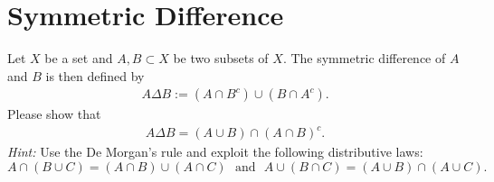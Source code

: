 \section{Symmetric Difference}
Let $X$ be a set and $A,B \subset X$ be two subsets of $X$. The symmetric difference of $A$ and $B$ is then defined by
	\begin{align*}
	A \Delta B := (A \cap {B}^c) \cup (B \cap {A}^c).
	\end{align*}
	Please show that 
	\begin{align*}
	A \Delta B = (A \cup B) \cap {(A \cap B)^c}.
	\end{align*}
\textit{Hint: }Use the De Morgan's rule and exploit the following distributive laws:
$$A \cap (B\cup C) = (A\cap B) \cup (A \cap C)~~~\text{and}~~~A \cup (B\cap C) = (A\cup B) \cap (A \cup C) .$$
